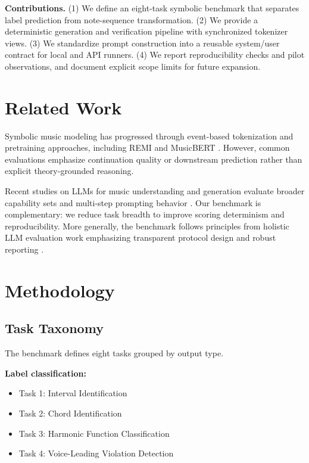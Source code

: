 \documentclass{article}
\begin{document}
\textbf{Contributions.}
(1) We define an eight-task symbolic benchmark that separates label prediction from note-sequence transformation.
(2) We provide a deterministic generation and verification pipeline with synchronized tokenizer views.
(3) We standardize prompt construction into a reusable system/user contract for local and API runners.
(4) We report reproducibility checks and pilot observations, and document explicit scope limits for future expansion.

\section{Related Work}
\label{sec:related_work}

Symbolic music modeling has progressed through event-based tokenization and pretraining approaches, including REMI and MusicBERT \cite{huang2020pop,huang2021musicbert}. However, common evaluations emphasize continuation quality or downstream prediction rather than explicit theory-grounded reasoning.

Recent studies on LLMs for music understanding and generation evaluate broader capability sets and multi-step prompting behavior \cite{zhou2024llmsmusicreason}. Our benchmark is complementary: we reduce task breadth to improve scoring determinism and reproducibility. More generally, the benchmark follows principles from holistic LLM evaluation work emphasizing transparent protocol design and robust reporting \cite{liang2023holistic}.

\section{Methodology}
\label{sec:design}

\subsection{Task Taxonomy}

The benchmark defines eight tasks grouped by output type.

\textbf{Label classification:}
\begin{itemize}
    \item Task 1: Interval Identification
    \item Task 2: Chord Identification
    \item Task 3: Harmonic Function Classification
    \item Task 4: Voice-Leading Violation Detection
\end{itemize}
\end{document}
